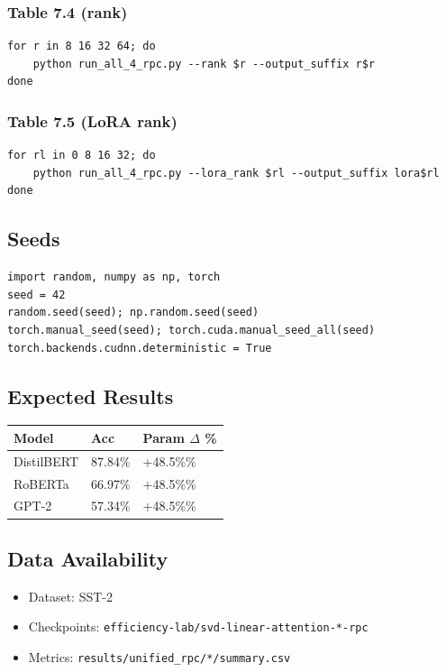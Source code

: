 \subsubsection{Table 7.4 (rank)}
\begin{lstlisting}
for r in 8 16 32 64; do
    python run_all_4_rpc.py --rank $r --output_suffix r$r
done
\end{lstlisting}

\subsubsection{Table 7.5 (LoRA rank)}
\begin{lstlisting}
for rl in 0 8 16 32; do
    python run_all_4_rpc.py --lora_rank $rl --output_suffix lora$rl
done
\end{lstlisting}

\subsection{Seeds}

\begin{lstlisting}
import random, numpy as np, torch
seed = 42
random.seed(seed); np.random.seed(seed)
torch.manual_seed(seed); torch.cuda.manual_seed_all(seed)
torch.backends.cudnn.deterministic = True
\end{lstlisting}

\subsection{Expected Results}

\begin{table}[H]
\centering
\small
\begin{tabular}{lll}
\toprule
\textbf{Model} & \textbf{Acc} & \textbf{Param $\Delta$ \%} \\
\midrule
DistilBERT & 87.84\% & +48.5\%\% \\
RoBERTa & 66.97\% & +48.5\%\% \\
GPT-2 & 57.34\% & +48.5\%\% \\
\bottomrule
\end{tabular}
\end{table}

\subsection{Data Availability}

\begin{itemize}
\item Dataset: SST-2
\item Checkpoints: \texttt{efficiency-lab/svd-linear-attention-*-rpc}
\item Metrics: \texttt{results/unified\_rpc/*/summary.csv}

\end{itemize}
